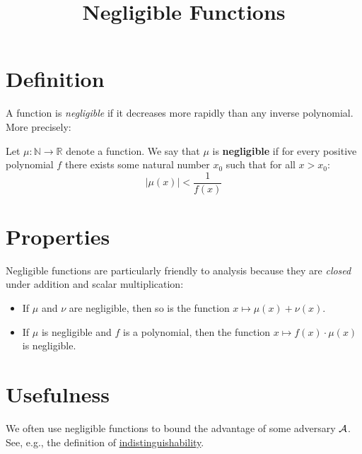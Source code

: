 \documentclass{article}
\title{Negligible Functions}
\begin{document}
\maketitle

\section{Definition}
A function is \emph{negligible} if it decreases more rapidly than any inverse polynomial.
More precisely:
\begin{definition}[Negligible]
  Let $\mu : \mathbb{N} \rightarrow \mathbb{R}$ denote a function.
  We say that $\mu$ is \textbf{negligible} if for every positive polynomial $f$ there exists some natural number $x_0$ such that for all $x > x_0$:
  \[
    |\mu(x)| < \frac{1}{f(x)}
  \]
\end{definition}

\section{Properties}

Negligible functions are particularly friendly to analysis because they are \emph{closed} under addition and scalar multiplication:

\begin{itemize}
  \item If $\mu$ and $\nu$ are negligible, then so is the function $x \mapsto \mu(x) + \nu(x)$.
  \item If $\mu$ is negligible and $f$ is a polynomial, then the function $x \mapsto f(x) \cdot \mu(x)$ is negligible.
\end{itemize}

\section{Usefulness}

We often use negligible functions to bound the advantage of some adversary $\mathcal{A}$.
See, e.g., the definition of \href{indistinguishability.html}{indistinguishability}.



\end{document}
